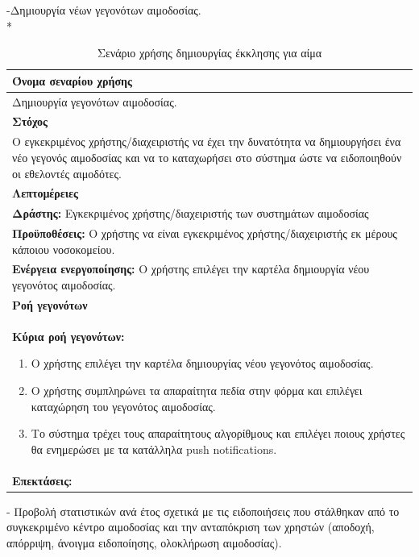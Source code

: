\newpage
-Δημιουργία νέων γεγονότων αιμοδοσίας.
\\*
\begin{table}[H]
	\begin{center}
	    \begin{tabular}{|p{\dimexpr \linewidth-2\tabcolsep}|}
	    \hline
	    \rowcolor{grayy}
	    \textbf{Όνομα σεναρίου χρήσης}
	    \\ \hline    
	    Δημιουργία γεγονότων αιμοδοσίας.
	     \\ \hline
	    \rowcolor{grayy}
	    \textbf{\textbf{Στόχος}}
	    \\ \hline
	 	 Ο εγκεκριμένος χρήστης/διαχειριστής να έχει την δυνατότητα να δημιουργήσει ένα νέο γεγονός αιμοδοσίας και να το καταχωρήσει στο σύστημα ώστε να ειδοποιηθούν οι εθελοντές αιμοδότες.
	    \\ \hline
	    \rowcolor{grayy}
	    \textbf{Λεπτομέρειες}
	    \\ \hline
		\textbf{Δράστης:} Εγκεκριμένος χρήστης/διαχειριστής των συστημάτων αιμοδοσίας
		\\*
		\textbf{Προϋποθέσεις:} Ο χρήστης να είναι εγκεκριμένος χρήστης/διαχειριστής εκ μέρους κάποιου νοσοκομείου.
		\\*
		\textbf{Ενέργεια ενεργοποίησης:} Ο χρήστης επιλέγει την καρτέλα δημιουργία νέου γεγονότος αιμοδοσίας.
		\\ \hline
		\rowcolor{grayy}    
	    \textbf{Ροή γεγονότων}
	    \\ \hline
		\textbf{Κύρια ροή γεγονότων:}
		\begin{enumerate}
		\item	 Ο χρήστης επιλέγει την καρτέλα δημιουργίας νέου γεγονότος αιμοδοσίας.
		\item Ο χρήστης συμπληρώνει τα απαραίτητα πεδία στην φόρμα και επιλέγει καταχώρηση του γεγονότος αιμοδοσίας.
		\item Το σύστημα τρέχει τους απαραίτητους αλγορίθμους και επιλέγει ποιους χρήστες θα ενημερώσει με τα κατάλληλα push notifications.
		\end{enumerate}
		\\ \hline
		\rowcolor{grayy}
		\textbf{Επεκτάσεις:}
		   \\ \hline
	    \end{tabular}
	    \caption{Σενάριο χρήσης δημιουργίας έκκλησης για αίμα}
	    \label{tab:create_blood_donor_event} 
	\end{center}
\end{table}

\newpage
- Προβολή στατιστικών ανά έτος σχετικά με τις ειδοποιήσεις που στάλθηκαν από το συγκεκριμένο κέντρο αιμοδοσίας και την ανταπόκριση των χρηστών (αποδοχή, απόρριψη, άνοιγμα ειδοποίησης, ολοκλήρωση αιμοδοσίας).

